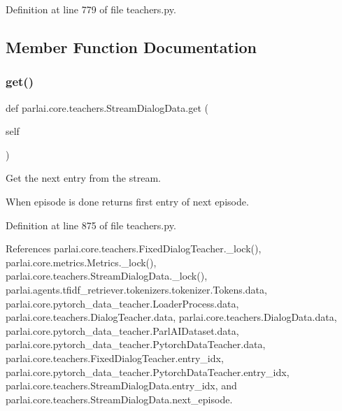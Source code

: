 Definition at line 779 of file teachers.\+py.



\subsection{Member Function Documentation}
\mbox{\label{classparlai_1_1core_1_1teachers_1_1StreamDialogData_a34ba92f60661471fee4eedb5ee2b9eda}} 
\subsubsection{\texorpdfstring{get()}{get()}}
{\footnotesize\ttfamily def parlai.\+core.\+teachers.\+Stream\+Dialog\+Data.\+get (\begin{DoxyParamCaption}\item[{}]{self }\end{DoxyParamCaption})}

\begin{DoxyVerb}Get the next entry from the stream.

When episode is done returns first entry of next episode.
\end{DoxyVerb}
 

Definition at line 875 of file teachers.\+py.



References parlai.\+core.\+teachers.\+Fixed\+Dialog\+Teacher.\+\_\+lock(), parlai.\+core.\+metrics.\+Metrics.\+\_\+lock(), parlai.\+core.\+teachers.\+Stream\+Dialog\+Data.\+\_\+lock(), parlai.\+agents.\+tfidf\+\_\+retriever.\+tokenizers.\+tokenizer.\+Tokens.\+data, parlai.\+core.\+pytorch\+\_\+data\+\_\+teacher.\+Loader\+Process.\+data, parlai.\+core.\+teachers.\+Dialog\+Teacher.\+data, parlai.\+core.\+teachers.\+Dialog\+Data.\+data, parlai.\+core.\+pytorch\+\_\+data\+\_\+teacher.\+Parl\+A\+I\+Dataset.\+data, parlai.\+core.\+pytorch\+\_\+data\+\_\+teacher.\+Pytorch\+Data\+Teacher.\+data, parlai.\+core.\+teachers.\+Fixed\+Dialog\+Teacher.\+entry\+\_\+idx, parlai.\+core.\+pytorch\+\_\+data\+\_\+teacher.\+Pytorch\+Data\+Teacher.\+entry\+\_\+idx, parlai.\+core.\+teachers.\+Stream\+Dialog\+Data.\+entry\+\_\+idx, and parlai.\+core.\+teachers.\+Stream\+Dialog\+Data.\+next\+\_\+episode.



